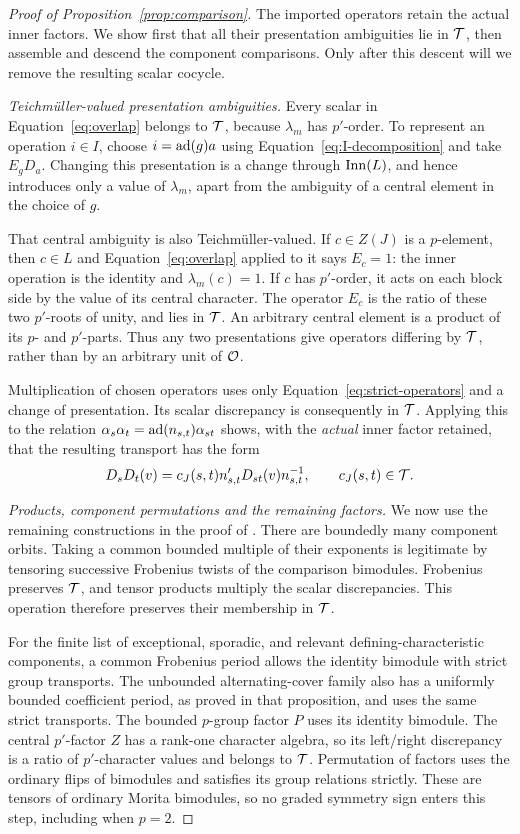 \begin{proof}[Proof of Proposition~\ref{prop:comparison}]
The imported operators retain the actual inner factors.  We show
first that all their presentation ambiguities lie in $\mathcal T$, then
assemble and descend the component comparisons.  Only after this
descent will we remove the resulting scalar cocycle.

\emph{Teichm\"uller-valued presentation ambiguities.}
Every scalar in Equation~\eqref{eq:overlap} belongs to $\mathcal T$,
because $\lambda_m$ has $p'$-order.  To represent an operation
$i\in I$, choose $i=\operatorname{ad}(g)a$ using
Equation~\eqref{eq:I-decomposition} and take $E_gD_a$.  Changing
this presentation is a change through $\operatorname{Inn}(L)$, and hence
introduces only a value of $\lambda_m$, apart from the ambiguity
of a central element in the choice of $g$.

That central ambiguity is also Teichm\"uller-valued.  If
$c\in Z(J)$ is a $p$-element, then $c\in L$ and
Equation~\eqref{eq:overlap} applied to it says
$E_c=1$: the inner operation is the identity and
$\lambda_m(c)=1$.  If $c$ has $p'$-order, it acts on each block
side by the value of its central character.  The operator $E_c$
is the ratio of these two $p'$-roots of unity, and lies in $\mathcal T$.
An arbitrary central element is a product of its $p$- and
$p'$-parts.  Thus any two presentations give operators differing
by $\mathcal T$, rather than by an arbitrary unit of $\mathcal O$.

Multiplication of chosen operators uses only
Equation~\eqref{eq:strict-operators} and a change of presentation.
Its scalar discrepancy is consequently in $\mathcal T$.  Applying this
to the relation
$\alpha_s\alpha_t=\operatorname{ad}(n_{s,t})\alpha_{st}$ shows, with the
\emph{actual} inner factor retained, that the resulting transport
has the form
\[
 D_sD_t(v)=c_J(s,t)n'_{s,t}D_{st}(v)n_{s,t}^{-1},
 \qquad c_J(s,t)\in\mathcal T.
\]

\emph{Products, component permutations and the remaining factors.}
We now use the remaining constructions in the proof of
\cite[Proposition~9.1]{OpenAIFieldDonovan2026}.
There are boundedly many component orbits.  Taking a common
bounded multiple of their exponents is legitimate by tensoring
successive Frobenius twists of the comparison bimodules.
Frobenius preserves $\mathcal T$, and tensor products multiply the scalar
discrepancies.  This operation therefore preserves their membership
in $\mathcal T$.

For the finite list of exceptional, sporadic, and relevant
defining-characteristic components, a common Frobenius period
allows the identity bimodule with strict group transports.
The unbounded alternating-cover family also has a uniformly
bounded coefficient period, as proved in that proposition, and
uses the same strict transports.  The bounded $p$-group factor
$P$ uses its identity bimodule.  The central $p'$-factor $Z$
has a rank-one character algebra, so its left/right discrepancy
is a ratio of $p'$-character values and belongs to $\mathcal T$.
Permutation of factors uses the ordinary flips of bimodules and
satisfies its group relations strictly.  These are tensors of
ordinary Morita bimodules, so no graded symmetry sign enters
this step, including when $p=2$.


\end{proof}
